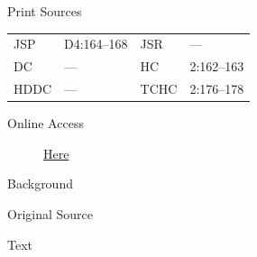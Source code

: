			\begin{description}
					\item[Print Sources]
				\end{description}

					\begin{tabular}{p{0.5in}p{1in}p{0.5in}p{1in}}
					JSP	 	& D4:164--168		& JSR 		& --- \\
					DC	 	& --- 		& HC 		& 2:162--163 \\
					HDDC 	& ---		& TCHC 		& 2:176--178 \\
					\end{tabular}
				
				\begin{description}
					\item[Online Access] \href{https://www.josephsmithpapers.org/paper-summary/minutes-8-september-1834/1}{Here}
				\end{description}
				
				\begin{description}
					\item[Background]
				\end{description}
				
				
				\begin{description}
					\item[Original Source]
				\end{description}
				
				
				\begin{description}
					\item[Text]
				\end{description}
				
